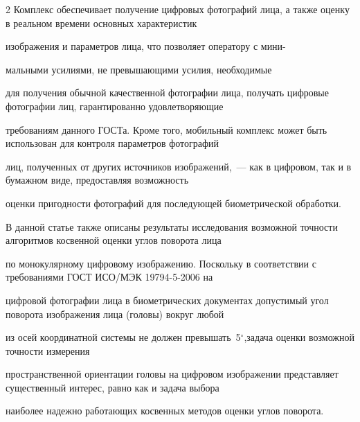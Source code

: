 \begin{multicols}{2}
Комплекс обеспечивает получение цифро\-вых фотографий лица, а также оценку в реальном времени основных характеристик 


изображения и параметров лица, что позволяет оператору с мини-\linebreak\vspace*{-12pt}


\columnbreak





\noindent


мальными усилиями, не превышающими усилия, необходимые 


для получения обычной качественной фотографии лица, получать циф\-ро\-вые фотографии лиц, гарантированно удовле\-тво\-ря\-ющие 


требованиям данного ГОСТа. Кроме того, мобильный комплекс может быть использован для контроля параметров фотографий 


лиц, полученных от других источников изображений,~--- как в цифровом, так и в бумажном виде, предоставляя возможность 


оценки пригодности фотографий для последующей биометрической обра\-ботки.


{ %





}





В данной статье также описаны результаты исследования возможной точности алгоритмов косвенной оценки углов поворота лица 


по монокулярному цифровому изображению. Поскольку в соответ\-ствии с требованиями ГОСТ ИСО/МЭК 19794-5-2006 на 


цифровой фотографии лица в биометрических документах допустимый угол поворота изоб\-ра\-же\-ния лица (головы) вокруг любой 


из осей координатной системы не должен превышать~5$^\circ$,\linebreak задача оценки возможной точности измерения 


пространственной ориентации головы на цифровом изоб\-ра\-же\-нии представляет существенный интерес, равно как и задача выбора 


наиболее надежно работающих косвенных методов оценки углов по\-во\-рота.


{





}
\end{multicols}
